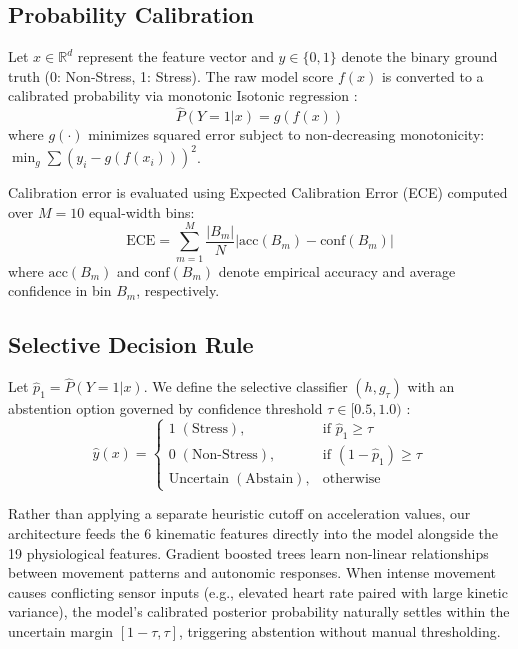 \documentclass[conference]{IEEEtran}
\begin{document}
\subsection{Probability Calibration}
Let $x \in \mathbb{R}^d$ represent the feature vector and $y \in \{0, 1\}$ denote the binary ground truth (0: Non-Stress, 1: Stress). The raw model score $f(x)$ is converted to a calibrated probability via monotonic Isotonic regression \cite{zadrozny2002transforming, niculescu2005predicting}:
\begin{equation}
\hat{P}(Y=1|x) = g(f(x))
\end{equation}
where $g(\cdot)$ minimizes squared error subject to non-decreasing monotonicity: $\min_g \sum (y_i - g(f(x_i)))^2$.

Calibration error is evaluated using Expected Calibration Error (ECE) \cite{guo2017calibration} computed over $M=10$ equal-width bins:
\begin{equation}
\text{ECE} = \sum_{m=1}^M \frac{|B_m|}{N} \left| \text{acc}(B_m) - \text{conf}(B_m) \right|
\end{equation}
where $\text{acc}(B_m)$ and $\text{conf}(B_m)$ denote empirical accuracy and average confidence in bin $B_m$, respectively.

\subsection{Selective Decision Rule}
Let $\hat{p}_1 = \hat{P}(Y=1|x)$. We define the selective classifier $(h, g_\tau)$ with an abstention option governed by confidence threshold $\tau \in [0.5, 1.0)$ \cite{chow1970optimum, geifman2017selective}:
\begin{equation}
\hat{y}(x) = 
\begin{cases} 
1 \; (\text{Stress}), & \text{if } \hat{p}_1 \ge \tau \\
0 \; (\text{Non-Stress}), & \text{if } (1 - \hat{p}_1) \ge \tau \\
\text{Uncertain} \; (\text{Abstain}), & \text{otherwise}
\end{cases}
\end{equation}

Rather than applying a separate heuristic cutoff on acceleration values, our architecture feeds the 6 kinematic features directly into the model alongside the 19 physiological features. Gradient boosted trees learn non-linear relationships between movement patterns and autonomic responses. When intense movement causes conflicting sensor inputs (e.g., elevated heart rate paired with large kinetic variance), the model's calibrated posterior probability naturally settles within the uncertain margin $[1-\tau, \tau]$, triggering abstention without manual thresholding.
\end{document}
